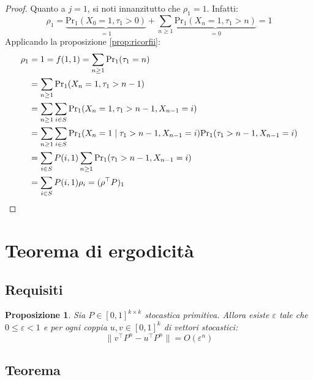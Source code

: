\documentclass{article}
\theoremstyle{plain}
\newtheorem{prop}{Proposizione}
\newcommand{\norm}[1]{\|#1\|}
\newcommand{\tra}{^\top}
\renewcommand{\epsilon}{\varepsilon}
\renewcommand{\Pr}{\mathrm{Pr}}
\begin{document}
\begin{proof}
	Quanto a $j=1$, si noti innanzitutto che $\rho_1=1$. Infatti:
	\begin{equation*}
		\rho_1 = \underbrace{\Pr_1(X_0=1,\tau_1>0)}_{=1} + \sum_{n\ge1} \underbrace{\Pr_1(X_n=1,\tau_1>n)}_{=0} = 1
	\end{equation*}
	Applicando la proposizione \ref{prop:ricorfii}:
	\begin{align*}
		\rho_1 & = 1 = f(1,1) = \sum_{n\ge1} \Pr_1(\tau_1=n)                                                  \\
		       & = \sum_{n\ge1} \Pr_1(X_n=1,\tau_1>n-1)                                                       \\
		       & = \sum_{n\ge1} \sum_{i\in S} \Pr_1(X_n=1,\tau_1>n-1,X_{n-1}=i)                               \\
		       & = \sum_{n\ge1} \sum_{i\in S} \Pr_1(X_n=1\mid\tau_1>n-1,X_{n-1}=i)\Pr_1(\tau_1>n-1,X_{n-1}=i) \\
		       & = \sum_{i\in S} P(i,1) \sum_{n\ge1} \Pr_1(\tau_1>n-1,X_{n-1}=i)                              \\
		       & = \sum_{i\in S} P(i,1) \rho_i = (\rho\tra P)_1 \qedhere
	\end{align*}
\end{proof}



\section{Teorema di ergodicità}


\subsection{Requisiti}
\begin{prop}\label{prop:stocconv}
	Sia $P\in[0,1]^{k\times k}$ stocastica primitiva. Allora esiste $\epsilon$ tale che $0\le\epsilon<1$ e per ogni coppia $u,v\in[0,1]^k$ di vettori stocastici:
	\begin{equation*}
		\norm{v\tra P^n-u\tra P^n} = O(\epsilon^n)
	\end{equation*}
\end{prop}


\subsection{Teorema}
\end{document}
